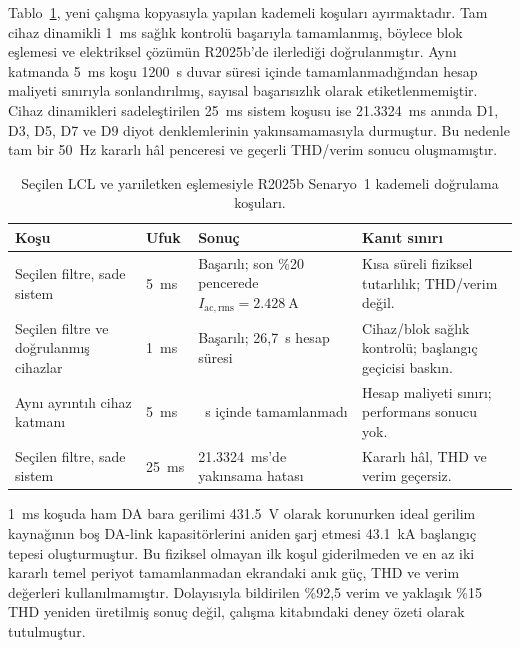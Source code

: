 Tablo~\ref{tab:r2025b-senaryo1-dogrulama}, yeni çalışma kopyasıyla yapılan kademeli koşuları ayırmaktadır. Tam cihaz dinamikli \SI{1}{\milli\second} sağlık kontrolü başarıyla tamamlanmış, böylece blok eşlemesi ve elektriksel çözümün R2025b'de ilerlediği doğrulanmıştır. Aynı katmanda \SI{5}{\milli\second} koşu 1200~s duvar süresi içinde tamamlanmadığından hesap maliyeti sınırıyla sonlandırılmış, sayısal başarısızlık olarak etiketlenmemiştir. Cihaz dinamikleri sadeleştirilen \SI{25}{\milli\second} sistem koşusu ise \SI{21.3324}{\milli\second} anında D1, D3, D5, D7 ve D9 diyot denklemlerinin yakınsamamasıyla durmuştur. Bu nedenle tam bir \SI{50}{\hertz} kararlı hâl penceresi ve geçerli THD/verim sonucu oluşmamıştır.

\begin{table}[htbp]
  \centering
  \caption{Seçilen LCL ve yarıiletken eşlemesiyle R2025b Senaryo~1 kademeli doğrulama koşuları.}
  \label{tab:r2025b-senaryo1-dogrulama}
  \footnotesize
  \begin{tabularx}{\textwidth}{>{\raggedright\arraybackslash}p{} >{\raggedright\arraybackslash}p{} >{\raggedright\arraybackslash}p{} >{\raggedright\arraybackslash}X}
    \toprule
    Koşu & Ufuk & Sonuç & Kanıt sınırı \\
    \midrule
    Seçilen filtre, sade sistem & \SI{5}{\milli\second} & Başarılı; son \%20 pencerede $I_{\mathrm{ac,rms}}=\SI{2.428}{\ampere}$ & Kısa süreli fiziksel tutarlılık; THD/verim değil. \\
    Seçilen filtre ve doğrulanmış cihazlar & \SI{1}{\milli\second} & Başarılı; 26,7~s hesap süresi & Cihaz/blok sağlık kontrolü; başlangıç geçicisi baskın. \\
    Aynı ayrıntılı cihaz katmanı & \SI{5}{\milli\second} & 1200~s içinde tamamlanmadı & Hesap maliyeti sınırı; performans sonucu yok. \\
    Seçilen filtre, sade sistem & \SI{25}{\milli\second} & \SI{21.3324}{\milli\second}'de yakınsama hatası & Kararlı hâl, THD ve verim geçersiz. \\
    \bottomrule
  \end{tabularx}
\end{table}

\SI{1}{\milli\second} koşuda ham DA bara gerilimi \SI{431.5}{\volt} olarak korunurken ideal gerilim kaynağının boş DA-link kapasitörlerini aniden şarj etmesi \SI{43.1}{\kilo\ampere} başlangıç tepesi oluşturmuştur. Bu fiziksel olmayan ilk koşul giderilmeden ve en az iki kararlı temel periyot tamamlanmadan ekrandaki anık güç, THD ve verim değerleri kullanılmamıştır. Dolayısıyla bildirilen \%92,5 verim ve yaklaşık \%15 THD yeniden üretilmiş sonuç değil, çalışma kitabındaki deney özeti olarak tutulmuştur.

